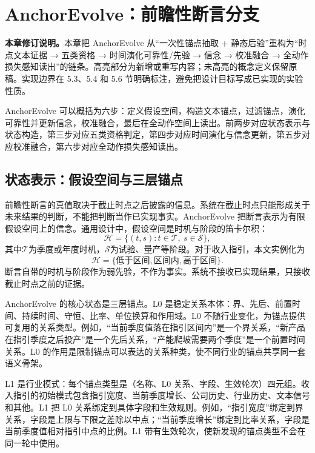 \chapter{AnchorEvolve：前瞻性断言分支}
\label{ch:anchor}

\begin{revbox}
\noindent\textbf{本章修订说明。}本章把 AnchorEvolve 从“一次性锚点抽取 + 静态后验”重构为“时点文本证据 → 五类资格 → 时间演化可靠性/先验 → 信念 → 校准融合 → 全动作损失感知读出”的链条。高亮部分为新增或重写内容；未高亮的概念定义保留原稿。实现边界在 5.3、5.4 和 5.6 节明确标注，避免把设计目标写成已实现的实验性质。
\end{revbox}

AnchorEvolve 可以概括为六步：定义假设空间，构造文本锚点，过滤锚点，演化可靠性并更新信念，校准融合，最后在全动作空间上读出。前两步对应状态表示与状态构造，第三步对应五类资格判定，第四步对应时间演化与信念更新，第五步对应校准融合，第六步对应全动作损失感知读出。

\section{状态表示：假设空间与三层锚点}

前瞻性断言的真值取决于截止时点之后披露的信息。系统在截止时点只能形成关于未来结果的判断，不能把判断当作已实现事实。AnchorEvolve 把断言表示为有限假设空间上的信念。通用设计中，假设空间是时机与阶段的笛卡尔积：
\begin{equation}
\mathcal H=\{(t,s):t\in\mathcal T,\ s\in\mathcal S\},
\end{equation}
其中$\mathcal T$为季度或年度时机，$\mathcal S$为试验、量产等阶段。对于收入指引，本文实例化为
\begin{equation}
\mathcal H=\{\text{低于区间},\text{区间内},\text{高于区间}\}.
\end{equation}
断言自带的时机与阶段作为弱先验，不作为事实。系统不接收已实现结果，只接收截止时点之前的证据。

AnchorEvolve 的核心状态是三层锚点。L0 是稳定关系本体：界、先后、前置时间、持续时间、守恒、比率、单位换算和作用域。L0 不随行业变化，为锚点提供可复用的关系类型。例如，“当前季度值落在指引区间内”是一个界关系，“新产品在指引季度之后投产”是一个先后关系，“产能爬坡需要两个季度”是一个前置时间关系。L0 的作用是限制锚点可以表达的关系种类，使不同行业的锚点共享同一套语义骨架。

L1 是行业模式：每个锚点类型是（名称、L0 关系、字段、生效轮次）四元组。收入指引的初始模式包含指引宽度、当前季度增长、公司历史、行业历史、文本信号和其他。L1 把 L0 关系绑定到具体字段和生效规则。例如，“指引宽度”绑定到界关系，字段是上限与下限之差除以中点；“当前季度增长”绑定到比率关系，字段是当前季度值相对指引中点的比例。L1 带有生效轮次，使新发现的锚点类型不会在同一轮中使用。

